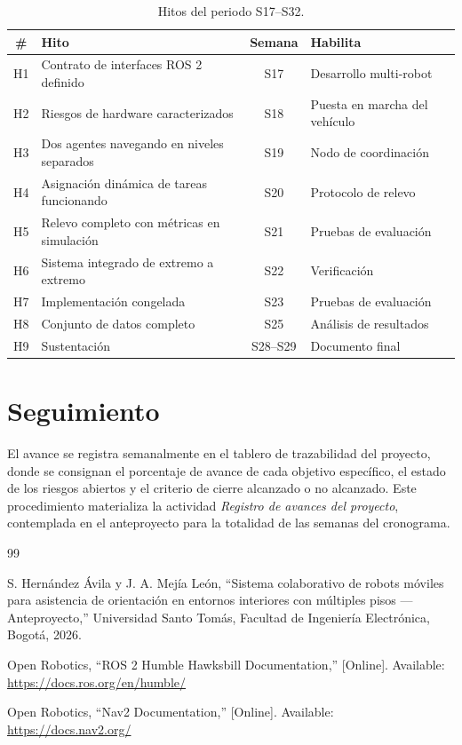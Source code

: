 \documentclass[12pt,letterpaper]{article}
\begin{document}
\begin{table}[H]
    \centering
    \small
    \caption{Hitos del periodo S17--S32.}
    \label{tab:hitos}
    \begin{tabular}{@{}cp{6.8cm}cp{4.2cm}@{}}
        \toprule
        \textbf{\#} & \textbf{Hito} & \textbf{Semana} & \textbf{Habilita} \\ \midrule
        H1 & Contrato de interfaces ROS 2 definido & S17 & Desarrollo multi-robot \\
        H2 & Riesgos de hardware caracterizados & S18 & Puesta en marcha del vehículo \\
        H3 & Dos agentes navegando en niveles separados & S19 & Nodo de coordinación \\
        H4 & Asignación dinámica de tareas funcionando & S20 & Protocolo de relevo \\
        H5 & Relevo completo con métricas en simulación & S21 & Pruebas de evaluación \\
        H6 & Sistema integrado de extremo a extremo & S22 & Verificación \\
        H7 & Implementación congelada & S23 & Pruebas de evaluación \\
        H8 & Conjunto de datos completo & S25 & Análisis de resultados \\
        H9 & Sustentación & S28--S29 & Documento final \\ \bottomrule
    \end{tabular}
\end{table}

\section{Seguimiento}

El avance se registra semanalmente en el tablero de trazabilidad del proyecto, donde se consignan el porcentaje de avance de cada objetivo específico, el estado de los riesgos abiertos y el criterio de cierre alcanzado o no alcanzado. Este procedimiento materializa la actividad \textit{Registro de avances del proyecto}, contemplada en el anteproyecto para la totalidad de las semanas del cronograma.

\begin{thebibliography}{99}

S. Hernández Ávila y J. A. Mejía León,
``Sistema colaborativo de robots móviles para asistencia de orientación en entornos interiores con múltiples pisos --- Anteproyecto,''
Universidad Santo Tomás, Facultad de Ingeniería Electrónica, Bogotá, 2026.

Open Robotics,
``ROS 2 Humble Hawksbill Documentation,''
[Online]. Available: \url{https://docs.ros.org/en/humble/}

Open Robotics,
``Nav2 Documentation,''
[Online]. Available: \url{https://docs.nav2.org/}

\end{thebibliography}
\end{document}
